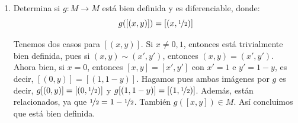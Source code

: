 \begin{ejer}
\begin{enumerate}
\begin{sol}
\begin{enumerate}
                $$(y-\nicefrac{1}{2})^2 =(1-y-\nicefrac{1}{2})^2 = (\nicefrac{1}{2}-y)^2$$ por lo que est\'a bien definida.
                Veamos si son diferenciables:
                $$f_2 \circ \varphi^{-1}(x,y)=f_2[x,y]=(y-\nicefrac{1}{2})^2$$
                $$f_2 \circ \psi^{-1}(x,y)=\begin{cases}
                    f_2[x+1,1-y] \\ f_2[x,y]
                \end{cases} = \begin{cases}
                    (1-y-\nicefrac{1}{2})^2 & 0\leq x< \nicefrac{1}{2} \\ (y-\nicefrac{1}{2})^2 &  -\nicefrac{1}{2}< x \leq0 
                \end{cases}= (y-\nicefrac{1}{2})^2$$
                que como hemos visto en el caso anterior, es diferenciable. 
                
                \textit{Observaci\'on.} Podr\'ia parecer que no es diferenciable por no coincidir los valores en el punto en el que no est\'a definido, pero es que este abierto total no es conexo, por lo que basta que sea diferenciable en cada componente conexa.
                \item Debería ser diferenciable.
            \end{enumerate}
        \end{sol}
        \item Determina si $g: M \to M$ est\'a bien definida y es diferenciable, donde:
        $$g([(x,y)]) = \left[\left(x,\nicefrac{1}{2}\right)\right]$$
        \begin{sol}
            Tenemos dos casos para $[(x,y)]$. Si $x \neq 0, 1$, entonces est\'a trivialmente bien definida, pues si $(x,y) \sim (x',y')$, entonces $(x,y) =(x',y')$. Ahora bien, si $x=0$, entonces $[x,y] = [x',y']$ con $x'=1$ e $y'=1-y$, es decir, $[(0,y)]=[(1,1-y)]$. Hagamos pues ambas im\'agenes por $g$ es decir, $g[(0,y)]=[(0,\nicefrac{1}{2})]$ y $g[(1,1-y)]=[(1, \nicefrac{1}{2})]$. Adem\'as, est\'an relacionados, ya que $\nicefrac{1}{2} = 1-\nicefrac{1}{2}$. Tambi\'en $g([x,y]) \in M$. As\'i concluimos que est\'a bien definida. 


\end{sol}
\end{enumerate}
\end{ejer}
